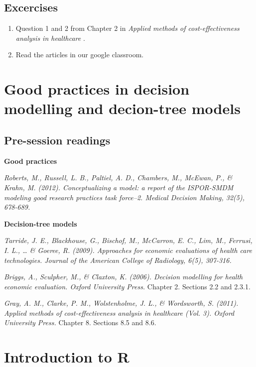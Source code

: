 \documentclass[
]{book}
\providecommand{\tightlist}{%
  \setlength{\itemsep}{0pt}\setlength{\parskip}{0pt}}
\begin{document}
\hypertarget{excercises-1}{%
\section{Excercises}\label{excercises-1}}

\begin{enumerate}
\def\labelenumi{\arabic{enumi}.}
\tightlist
\item
  Question 1 and 2 from Chapter 2 in \emph{Applied methods of cost-effectiveness analysis in healthcare }.
\item
  Read the articles in our google classroom.
\end{enumerate}

\hypertarget{tree}{%
\chapter{Good practices in decision modelling and decion-tree models}\label{tree}}

\hypertarget{pre-session-readings-2}{%
\section{Pre-session readings}\label{pre-session-readings-2}}

\textbf{Good practices}

\emph{Roberts, M., Russell, L. B., Paltiel, A. D., Chambers, M., McEwan, P., \& Krahn, M. (2012). Conceptualizing a model: a report of the ISPOR-SMDM modeling good research practices task force--2. Medical Decision Making, 32(5), 678-689.}

\textbf{Decision-tree models}

\emph{Tarride, J. E., Blackhouse, G., Bischof, M., McCarron, E. C., Lim, M., Ferrusi, I. L., \ldots{} \& Goeree, R. (2009). Approaches for economic evaluations of health care technologies. Journal of the American College of Radiology, 6(5), 307-316.}

\emph{Briggs, A., Sculpher, M., \& Claxton, K. (2006). Decision modelling for health economic evaluation. Oxford University Press.} Chapter 2. Sections 2.2 and 2.3.1.

\emph{Gray, A. M., Clarke, P. M., Wolstenholme, J. L., \& Wordsworth, S. (2011). Applied methods of cost-effectiveness analysis in healthcare (Vol. 3). Oxford University Press.} Chapter 8. Sections 8.5 and 8.6.

\hypertarget{introduction-to-r}{%
\chapter*{Introduction to R}\label{introduction-to-r}}
\end{document}
